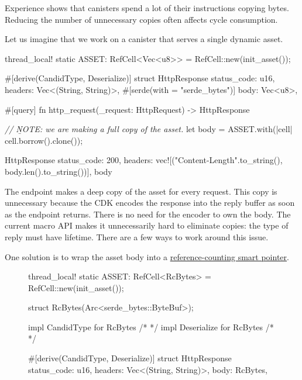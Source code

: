 \documentclass{article}
\begin{document}

Experience shows that canisters spend a lot of their instructions copying bytes.
Reducing the number of unnecessary copies often affects cycle consumption.

Let us imagine that we work on a canister that serves a single dynamic asset.

\begin{code}[rust]
thread_local!{
    static ASSET: RefCell<Vec<u8>> = RefCell::new(init_asset());
}

#[derive(CandidType, Deserialize)]
struct HttpResponse {
    status_code: u16,
    headers: Vec<(String, String)>,
    #[serde(with = "serde_bytes")]
    body: Vec<u8>,
}

#[query]
fn http_request(_request: HttpRequest) -> HttpResponse {
    \emph{// \b{NOTE}: we are making a full copy of the asset.}
    let body = ASSET.with(|cell| cell.borrow().clone());

    HttpResponse {
        status_code: 200,
        headers: vec![("Content-Length".to_string(), body.len().to_string())],
        body
    }
}
\end{code}

The  endpoint makes a deep copy of the asset for every request.
This copy is unnecessary because the CDK encodes the response into the reply buffer as soon as the endpoint returns.
There is no need for the encoder to own the body.
The current macro API makes it unnecessarily hard to eliminate copies: the type of reply must have  lifetime.
There are a few ways to work around this issue.

One solution is to wrap the asset body into a \href{https://doc.rust-lang.org/std/sync/struct.Arc.html}{reference-counting smart pointer}.

\begin{figure}
\begin{code}[rust]
thread_local!{
    static ASSET: RefCell<RcBytes> = RefCell::new(init_asset());
}

struct RcBytes(Arc<serde_bytes::ByteBuf>);

impl CandidType for RcBytes { /* */ }
impl Deserialize for RcBytes { /* */ }

#[derive(CandidType, Deserialize)]
struct HttpResponse {
    status_code: u16,
    headers: Vec<(String, String)>,
    body: RcBytes,
}
\end{code}
\end{figure}
\end{document}
